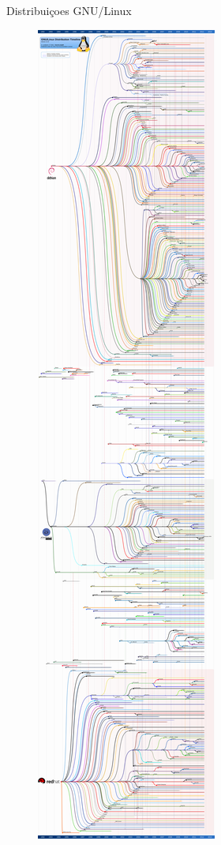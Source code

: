 \documentclass{beamer}
\begin{document}
\begin{frame}{Distribuiçoes GNU/Linux}
\begin{figure}[tbph]
\includegraphics[height=0.95\textheight]{./gldt1210}
\end{figure}
\end{frame}
\end{document}

